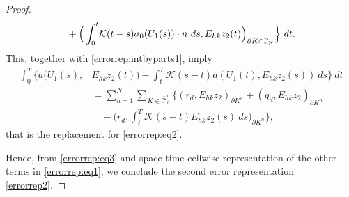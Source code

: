 \documentclass{amsart}
\numberwithin{equation}{section}
\theoremstyle{definition}
\begin{document}
\begin{proof}
\begin{equation*}
\begin{split}
    &\quad +
        \Big(\int_0^t\! {\mathcal K}(t-s)\sigma_0(U_1(s))\cdot n\ ds,E_{hk}z_2(t)
        \Big)_{\partial K \cap \Gamma_{\text N}}\Big\}\ dt.
  \end{split}
\end{equation*}
This, together with \eqref{errorrep:intbyparts1}, imply
\begin{equation}   \label{errorrep:eq3}
  \begin{split}
    \int_0^T\! 
    \Big\{a(U_1(s),&E_{hk}z_2(t)) 
       -\int_t^T\! \!{\mathcal K}(s-t)a(U_1(t),E_{hk}z_2(s))\ ds
       \Big\}\ dt\\
    &=\sum_{n=1}^N \sum_{K\in\bar{\mathcal T}_h^n}\!
      \bigg\{\!(r_d,E_{hk}z_2)_{\partial K^n} 
        + (g_d,E_{hk}z_2)_{\partial K^n}\\
    &\quad  
      -\Big(r_d,\int_t^T\!\! {\mathcal K}(s-t)E_{hk}z_2(s)\ ds\Big)_{\partial K^n}
      \bigg\},
  \end{split}
\end{equation}
that is the replacement for \eqref{errorrep:eq2}. 

Hence, from \eqref{errorrep:eq3} and space-time cellwise
representation of the other terms in \eqref{errorrep:eq1}, 
we conclude the second error representation
\eqref{errorrep2}. 


\end{proof}
\end{document}
